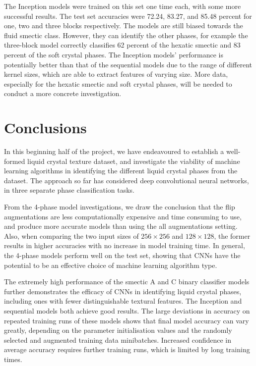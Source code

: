 \documentclass[12pt]{article}
\begin{document}
The Inception models were trained on this set one time each, with some more successful results. The test set accuracies were 72.24, 83.27, and 85.48 percent for one, two and three blocks respectively. The models are still biased towards the fluid smectic class. However, they can identify the other phases, for example the three-block model correctly classifies 62 percent of the hexatic smectic and 83 percent of the soft crystal phases. The Inception models' performance is potentially better than that of the sequential models due to the range of different kernel sizes, which are able to extract features of varying size. More data, especially for the hexatic smectic and soft crystal phases, will be needed to conduct a more concrete investigation.
\section{Conclusions}
In this beginning half of the project, we have endeavoured to establish a well-formed liquid crystal texture dataset, and investigate the viability of machine learning algorithms in identifying the different liquid crystal phases from the dataset. The approach so far has considered deep convolutional neural networks, in three separate phase classification tasks. 

From the 4-phase model investigations, we draw the conclusion that the flip augmentations are less computationally expensive and time consuming to use, and produce more accurate models than using the all augmentations setting. Also, when comparing the two input sizes of $256 \times 256$ and $128 \times 128$, the former results in higher accuracies with no increase in model training time. In general, the 4-phase models perform well on the test set, showing that CNNs have the potential to be an effective choice of machine learning algorithm type.

The extremely high performance of the smectic A and C binary classifier models further demonstrates the efficacy of CNNs in identifying liquid crystal phases, including ones with fewer distinguishable textural features. The Inception and sequential models both achieve good results. The large deviations in accuracy on repeated training runs of these models shows that final model accuracy can vary greatly, depending on the parameter initialisation values and the randomly selected and augmented training data minibatches. Increased confidence in average accuracy requires further training runs, which is limited by long training times. 
\end{document}
